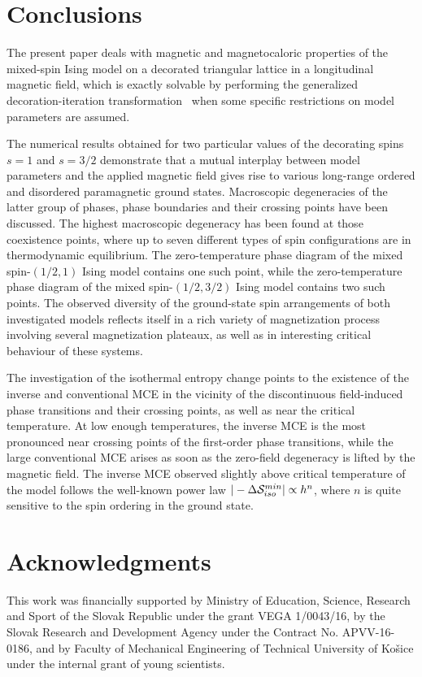 \documentclass[final,5p,times,sort&compress]{elsarticle}
\begin{document}
\section{Conclusions}
\label{sec:4}

The present paper deals with magnetic and magnetocaloric properties of the mixed-spin Ising model on a decorated triangular lattice in a longitudinal magnetic field, which is exactly solvable by performing the generalized decoration-iteration \linebreak transformation~\cite{Fis59,Dom60,Syo72,Str10} when some specific restrictions on mo\-del parameters are assumed.

The numerical results obtained for two particular values of the decorating spins $s = 1$ and $s = 3/2$ demonstrate that a mutual interplay between model parameters and the applied magnetic field gives rise to various long-range ordered and disordered paramagnetic ground states. Macroscopic degeneracies of the latter group of phases, phase boundaries and their crossing points have been discussed. The highest macroscopic degeneracy has been found at those coexistence points, where up to seven different types of spin configurations are in thermodynamic equilibrium. The zero-temperature phase diagram of the mixed spin-$(1/2,1)$ Ising model contains one such point, while the zero-temperature phase diagram of the mixed spin-$(1/2,3/2)$ Ising model contains two such points. The observed diversity of the ground-state spin arrangements of both investigated models reflects itself in a rich variety of magnetization process involving several magnetization plateaux, as well as in interesting critical behaviour of these systems.

The investigation of the isothermal entropy change points to the existence of the inverse and conventional MCE in the vicinity of the discontinuous field-induced phase transitions and their crossing points, as well as near the critical temperature. At low enough temperatures, the inverse MCE is the most pronounced near crossing points of the first-order phase transitions, while the large conventional MCE arises as soon as the zero-field degeneracy is lifted by the magnetic field. The inverse MCE  observed slightly above critical temperature of the model follows the well-known power law $|-\Delta {\cal S}_{iso}^{min}|\propto h^n$, where $n$ is quite sensitive to the spin ordering in the ground state.


\section*{Acknowledgments}
This work was financially supported by Ministry of Education, Science, Research and
Sport of the Slovak Republic under the grant VEGA 1/0043/16, by the Slovak
Research and Development Agency under the Contract No. APVV-16-0186, and by Faculty of Mechanical Engineering of Technical University of Ko\v{s}ice under the internal grant of young scientists.
\end{document}
